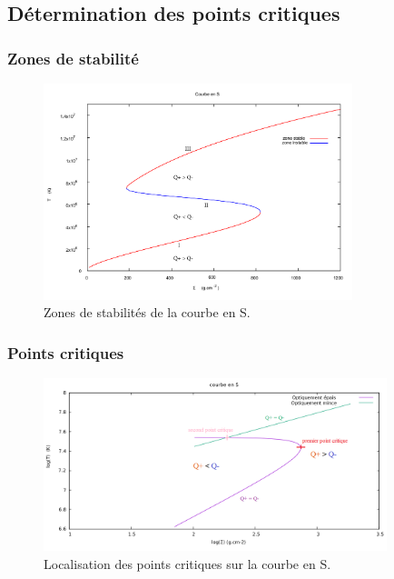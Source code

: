 
\subsection*{Détermination des points critiques}
\begin{frame}
\frametitle{Zones de stabilité}

   \begin{figure}[htb!]
      \includegraphics[width=9cm]{figures/stable.pdf}
      \caption{Zones de stabilités de la courbe en S.}
    \end{figure}
\end{frame}

\begin{frame}		
\frametitle{Points critiques}		
		
   \begin{figure}[htb!]		
      \includegraphics[width=10cm]{figures/points_critiques.png}		
      \caption{Localisation des points critiques sur la courbe en S.}		
    \end{figure}		
\end{frame}		



